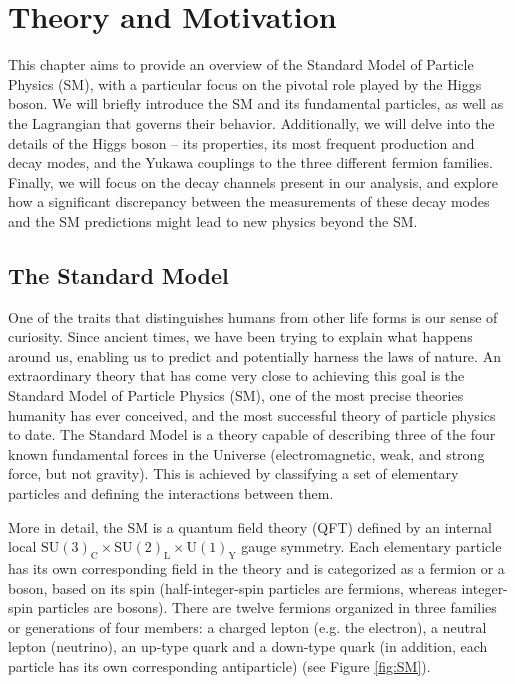 \chapter[Theory and Motivation]{Theory and Motivation}

This chapter aims to provide an overview of the Standard Model of Particle Physics (SM), with a particular focus on the pivotal role played by the Higgs boson. We will briefly introduce the SM and its fundamental particles, as well as the Lagrangian that governs their behavior. Additionally, we will delve into the details of the Higgs boson – its properties, its most frequent production and decay modes, and the Yukawa couplings to the three different fermion families. Finally, we will focus on the decay channels present in our analysis, and explore how a significant discrepancy between the measurements of these decay modes and the SM predictions might lead to new physics beyond the SM.

\section{The Standard Model}

One of the traits that distinguishes humans from other life forms is our sense of curiosity. Since ancient times, we have been trying to explain what happens around us, enabling us to predict and potentially harness the laws of nature. An extraordinary theory that has come very close to achieving this goal is the Standard Model of Particle Physics (SM), one of the most precise theories humanity has ever conceived, and the most successful theory of particle physics to date. The Standard Model is a theory capable of describing three of the four known fundamental forces in the Universe (electromagnetic, weak, and strong force, but not gravity). This is achieved by classifying a set of elementary particles and defining the interactions between them.

More in detail, the SM is a quantum field theory (QFT) defined by an internal local $\text{SU}(3)_{\text{C}}\times \text{SU}(2)_{\text{L}}\times \text{U}(1)_{\text{Y}}$ gauge symmetry. Each elementary particle has its own corresponding field in the theory and is categorized as a fermion or a boson, based on its spin (half-integer-spin particles are fermions, whereas integer-spin particles are bosons). There are twelve fermions organized in three families or generations of four members: a charged lepton (e.g. the electron), a neutral lepton (neutrino), an up-type quark and a down-type quark (in addition, each particle has its own corresponding antiparticle) (see Figure \ref{fig:SM}).

